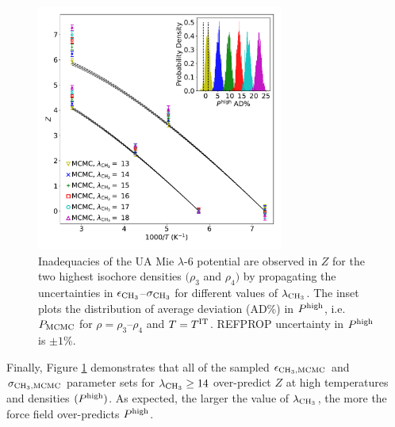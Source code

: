 \documentclass[preprint,letterpaper,floatfix,citeautoscript,aip,jcp]{revtex4-1}
\begin{document}
\begin{figure}[htb!]
	\centering
	\includegraphics[width=3.2in]{MCMC_ethane_Phigh}
	\caption{Inadequacies of the UA Mie $\lambda$-6 potential are observed in $Z$ for the two highest isochore densities $(\rho_3$ and $\rho_4)$ by propagating the uncertainties in $\epsilon_{\rm CH_3}$--$\sigma_{\rm CH_3}$ for different values of $\lambda_{\rm CH_3}$. The inset plots the distribution of average deviation (AD\%) in $P^{\rm high}$, i.e. $P_{\rm MCMC}$ for $\rho = \rho_3$--$\rho_4$ and $T = T^{\rm IT}$. REFPROP uncertainty in $P^{\rm high}$ is $\pm 1$\%.}
	\label{fig:MCMC_ethane_Phigh}
\end{figure} 

Finally, Figure \ref{fig:MCMC_ethane_Phigh} demonstrates that all of the sampled $\epsilon_{\rm CH_3, MCMC}$ and $\sigma_{\rm CH_3, MCMC}$ parameter sets for $\lambda_{\rm CH_3} \ge 14$ over-predict $Z$ at high temperatures and densities $(P^{\rm high})$. As expected, the larger the value of $\lambda_{\rm CH_3}$, the 
more 
the force field over-predicts $P^{\rm high}$.
\end{document}
